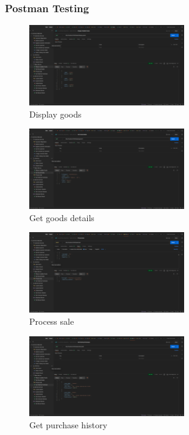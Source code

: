 \documentclass[a4paper,12pt]{article}
\begin{document}
\subsubsection{Postman Testing}
\begin{figure}[H]
  \centering
  \includegraphics[width=0.6\textwidth]{images/11.png}
  \caption{Display goods}
\end{figure}
\begin{figure}[H]
  \centering
  \includegraphics[width=0.6\textwidth]{images/12.png}
  \caption{Get goods details}
\end{figure}
\begin{figure}[H]
  \centering
  \includegraphics[width=0.6\textwidth]{images/13.png}
  \caption{Process sale}
\end{figure}
\begin{figure}[H]
  \centering
  \includegraphics[width=0.6\textwidth]{images/14.png}
  \caption{Get purchase history}
\end{figure}
\end{document}
